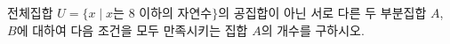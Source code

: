 전체집합 $U=\{x \mid x$는 $8$ 이하의 자연수$\}$의 공집합이 아닌 서로 다른 두 부분집합 $A$, $B$에 대하여 다음 조건을 모두 만족시키는 집합 $A$의 개수를 구하시오.
